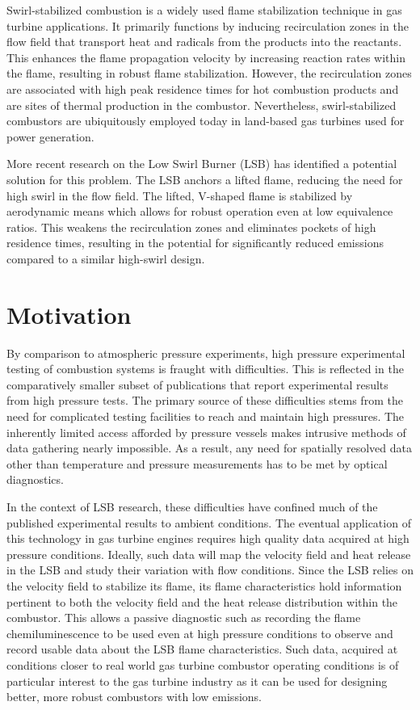 Swirl-stabilized combustion is a widely used flame stabilization technique in gas turbine applications.\cite{1974-syred,1977-lilley}
It primarily functions by inducing recirculation zones in the flow field that transport heat and radicals from the products into the reactants.
This enhances the flame propagation velocity by increasing reaction rates within the flame, resulting in robust flame stabilization.
However, the recirculation zones are associated with high peak residence times for hot combustion products and are sites of thermal  production in the combustor.
Nevertheless, swirl-stabilized combustors are ubiquitously employed today in land-based gas turbines used for power generation.

More recent research\cite{1995-bedat} on the Low Swirl Burner (LSB) has identified a potential solution for this problem.
The LSB anchors a lifted flame, reducing the need for high swirl in the flow field.
The lifted, V-shaped flame is stabilized by aerodynamic means which allows for robust operation even at low equivalence ratios.
This weakens the recirculation zones and eliminates pockets of high residence times, resulting in the potential for significantly reduced  emissions compared to a similar high-swirl design.

\section{Motivation}

By comparison to atmospheric pressure experiments, high pressure experimental testing of combustion systems is fraught with difficulties.
This is reflected in the comparatively smaller subset of publications that report experimental results from high pressure tests.
The primary source of these difficulties stems from the need for complicated testing facilities to reach and maintain high pressures.
The inherently limited access afforded by pressure vessels makes intrusive methods of data gathering nearly impossible.
As a result, any need for spatially resolved data other than temperature and pressure measurements has to be met by optical diagnostics.

In the context of LSB research, these difficulties have confined much of the published experimental results to ambient conditions.
The eventual application of this technology in gas turbine engines requires high quality data acquired at high pressure conditions.
Ideally, such data will map the velocity field and heat release in the LSB and study their variation with flow conditions.
Since the LSB relies on the velocity field to stabilize its flame, its flame characteristics hold information pertinent to both the velocity field and the heat release distribution within the combustor.
This allows a passive diagnostic such as recording the flame chemiluminescence to be used even at high pressure conditions to observe and record usable data about the LSB flame characteristics.
Such data, acquired at conditions closer to real world gas turbine combustor operating conditions is of particular interest to the gas turbine industry as it can be used for designing better, more robust combustors with low  emissions.

